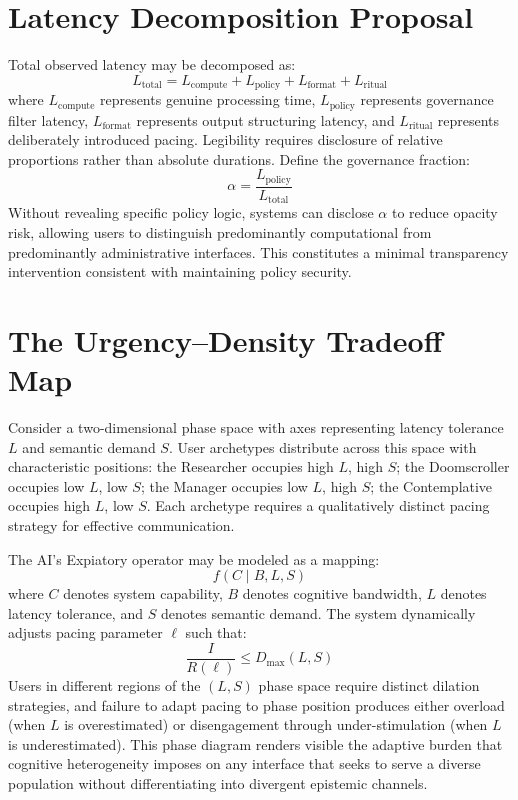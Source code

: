 \documentclass[12pt]{article}
\begin{document}
\section{Latency Decomposition Proposal}

Total observed latency may be decomposed as:
\[
L_{\text{total}} = L_{\text{compute}} + L_{\text{policy}} + L_{\text{format}} + L_{\text{ritual}}
\]
where $L_{\text{compute}}$ represents genuine processing time, $L_{\text{policy}}$ represents governance filter latency, $L_{\text{format}}$ represents output structuring latency, and $L_{\text{ritual}}$ represents deliberately introduced pacing. Legibility requires disclosure of relative proportions rather than absolute durations. Define the governance fraction:
\[
\alpha = \frac{L_{\text{policy}}}{L_{\text{total}}}
\]
Without revealing specific policy logic, systems can disclose $\alpha$ to reduce opacity risk, allowing users to distinguish predominantly computational from predominantly administrative interfaces. This constitutes a minimal transparency intervention consistent with maintaining policy security.

\section{The Urgency--Density Tradeoff Map}

Consider a two-dimensional phase space with axes representing latency tolerance $L$ and semantic demand $S$. User archetypes distribute across this space with characteristic positions: the Researcher occupies high $L$, high $S$; the Doomscroller occupies low $L$, low $S$; the Manager occupies low $L$, high $S$; the Contemplative occupies high $L$, low $S$. Each archetype requires a qualitatively distinct pacing strategy for effective communication.

The AI's Expiatory operator may be modeled as a mapping:
\[
f(C \mid B, L, S)
\]
where $C$ denotes system capability, $B$ denotes cognitive bandwidth, $L$ denotes latency tolerance, and $S$ denotes semantic demand. The system dynamically adjusts pacing parameter $\ell$ such that:
\[
\frac{I}{R(\ell)} \le D_{\max}(L, S)
\]
Users in different regions of the $(L, S)$ phase space require distinct dilation strategies, and failure to adapt pacing to phase position produces either overload (when $L$ is overestimated) or disengagement through under-stimulation (when $L$ is underestimated). This phase diagram renders visible the adaptive burden that cognitive heterogeneity imposes on any interface that seeks to serve a diverse population without differentiating into divergent epistemic channels.
\end{document}

